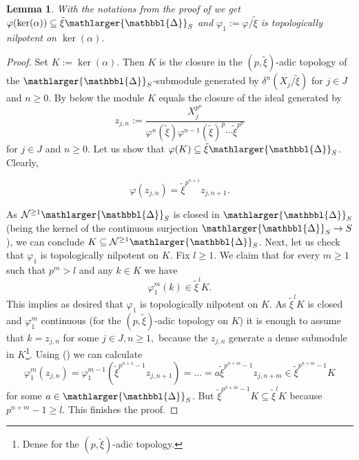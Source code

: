 \documentclass{amsart}
\newcommand{\prism}{{\mathlarger{\mathbbl{\Delta}}}}
\theoremstyle{plain}
\newtheorem{lemma}[theorem]{Lemma}
\theoremstyle{definition}
\newcommand{\tilxi}{\tilde{\xi}}
\newcommand{\blue}[1]{{\color{black}#1}}
\begin{document}
  \begin{lemma}
    \label{sec:essent-surj-divided-varphi-topological-nilpotent-on-the-kernel}
    With the notations from the proof of
     we get
    $\varphi(\ker(\alpha))\subseteq \tilxi \prism_S$ and
    $\varphi_1:=\varphi/\tilxi$ is topologically nilpotent on
    $\ker(\alpha)$.
  \end{lemma}
  \begin{proof}
    Set $K:=\ker(\alpha)$. Then $K$ is the closure in the
    $(p,\tilxi)$-adic topology of the $\prism_S$-submodule generated
    by $\delta^n(X_j/\tilxi)$ for $j\in J$ and $n\geq 0$. By  \blue{below} the module $K$ equals the closure of the ideal generated by
    $$
    z_{j,n}:=\frac{X_j^{p^n}}{\varphi^{n}(\tilxi)\varphi^{n-1}(\tilxi)^p\cdots
    \tilxi^{p^n}}
  $$
  for $j\in J$ and $n\geq 0$. Let us show that $\varphi(K)\subseteq \tilxi \prism_S$. Clearly,

  \begin{equation}
    \label{equation-how-varphi-acts-on-z_jn}
    \varphi(z_{j,n})=\tilxi^{p^{n+1}}z_{j,n+1}.
  \end{equation}

  As $\mathcal{N}^{\geq 1}\prism_S$ is closed in $\prism_S$ (being the kernel of the continuous surjection $\prism_S\to S$), we can conclude $K\subseteq \mathcal{N}^{\geq 1}\prism_S$.
  Next, let us check that $\varphi_1$ is topologically nilpotent on $K$. Fix $l\geq 1$. We claim that for every $m\geq 1$ such that $p^m> l$ and any $k\in K$ we have
  $$
  \varphi_1^m(k)\in \tilxi^{l}K.
  $$
  This implies as desired that $\varphi_1$ is topologically nilpotent on $K$. As $\tilxi^lK$ is closed and $\varphi_1^m$ continuous (for the $(p,\tilxi)$-adic topology on $K$) it is enough to assume that $k=z_{j,n}$ for some $j\in J, n\geq 1,$ because the $z_{j,n}$ generate a dense submodule in $K$\footnote{Dense for the $(p,\tilxi)$-adic topology.}. Using () we can calculate
  $$
  \varphi_1^m(z_{j,n})=\varphi_1^{m-1}(\tilxi^{p^{n+1}-1}z_{j,n+1})=\ldots = a\tilxi^{p^{n+m}-1}z_{j,n+m}\in \tilxi^{p^{n+m}-1}K
  $$
  for some $a\in \prism_S$. But $\tilxi^{p^{n+m}-1}K\subseteq \tilxi^lK$ because $p^{n+m}-1\geq l$. This finishes the proof.
\end{proof}
\end{document}

